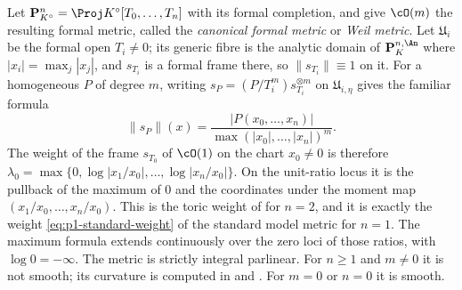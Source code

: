 \begin{example}
\label{ex:ch17-weil-metric}
Let $\mathbf P^n_{K^\circ}=\Proj K^\circ[T_0,\dots,T_n]$ with its formal
completion, and give $\cO(m)$ the resulting formal metric, called the
\emph{canonical formal metric} or \emph{Weil metric}.  Let $\mathfrak U_i$
be the formal open $T_i\ne0$; its generic fibre is the analytic domain of
$\mathbf P^{n,\An}_K$ where $|x_i|=\max_j|x_j|$, and $s_{T_i}$ is a
formal frame there, so $\|s_{T_i}\|\equiv1$ on it.  For a homogeneous
$P$ of degree $m$, writing $s_P=(P/T_i^m)s_{T_i}^{\otimes m}$ on
$\mathfrak U_{i,\eta}$ gives the familiar formula
\begin{equation}
\label{eq:ch17-weil-metric}
 \|s_P\|(x)=\frac{|P(x_0,\dots,x_n)|}{\max(|x_0|,\dots,|x_n|)^m}.
\end{equation}
The weight of the frame $s_{T_0}$ of $\cO(1)$ on the chart $x_0\ne0$
is therefore
$\lambda_0=\max\{0,\log|x_1/x_0|,\dots,\log|x_n/x_0|\}$.
On the unit-ratio locus it is the pullback of the maximum of $0$ and
the coordinates under the moment map $(x_1/x_0,\dots,x_n/x_0)$.
This is the toric weight of
 for $n=2$, and it is exactly the weight
\eqref{eq:p1-standard-weight} of the standard model metric for $n=1$.
The maximum formula extends continuously over the zero loci of those
ratios, with $\log0=-\infty$.  The metric is strictly integral parlinear.
For $n\ge1$ and $m\ne0$ it is not smooth; its curvature is computed in
 and
.  For $m=0$ or $n=0$ it is
smooth.
\end{example}

